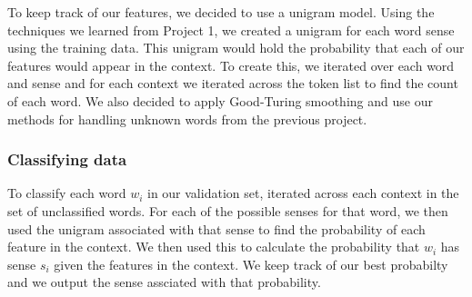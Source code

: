 \documentclass[11pt]{article}
\begin{document}
To keep track of our features, we decided to use a unigram model. Using the techniques we learned from Project 1, we created a unigram for each word sense using the training data. This unigram would hold the probability that each of our features would appear in the context. To create this, we iterated over each word and sense and for each context we iterated across the token list to find the count of each word. We also decided to apply Good-Turing smoothing and use our methods for handling unknown words from the previous project. \\ 

\subsubsection{Classifying data}

To classify each word $w_i$ in our validation set, iterated across each context in the set of unclassified words. For each of the possible senses for that word, we then used the unigram associated with that sense to find the probability of each feature in the context. We then used this to calculate the probability that $w_i$ has sense $s_i$ given the features in the context. We keep track of our best probabilty and we output the sense assciated with that probability.
\end{document}
